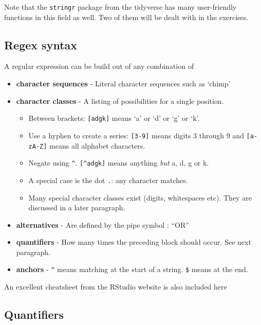 \documentclass[]{book}
\providecommand{\tightlist}{%
  \setlength{\itemsep}{0pt}\setlength{\parskip}{0pt}}
\begin{document}
Note that the \texttt{stringr} package from the tidyverse has many user-friendly functions in this field as well. Two of them will be dealt with in the exercises.

\hypertarget{regex-syntax}{%
\subsection{Regex syntax}\label{regex-syntax}}

A regular expression can be build out of any combination of

\begin{itemize}
\tightlist
\item
  \textbf{character sequences} - Literal character sequences such as `chimp'\\
\item
  \textbf{character classes} - A listing of possibilities for a single position.

  \begin{itemize}
  \tightlist
  \item
    Between brackets: \texttt{{[}adgk{]}} means `a' or `d' or `g' or `k'.
  \item
    Use a hyphen to create a series: \texttt{{[}3-9{]}} means digits 3 through 9 and \texttt{{[}a-zA-Z{]}} means all alphabet characters.
  \item
    Negate using \texttt{\^{}}. \texttt{{[}\^{}adgk{]}} means anything \emph{but} a, d, g or k.
  \item
    A special case is the dot \texttt{.}: any character matches.\\
  \item
    Many special character classes exist (digits, whitespaces etc). They are discussed in a later paragraph.
  \end{itemize}
\item
  \textbf{alternatives} - Are defined by the pipe symbol \texttt{\textbar{}}: ``OR''\\
\item
  \textbf{quantifiers} - How many times the preceding block should occur. See next paragraph.\\
\item
  \textbf{anchors} - \texttt{\^{}} means matching at the start of a string. \texttt{\$} means at the end.
\end{itemize}

An excellent cheatsheet from the RStudio website is also included
here

\hypertarget{quantifiers}{%
\subsection{Quantifiers}\label{quantifiers}}
\end{document}
